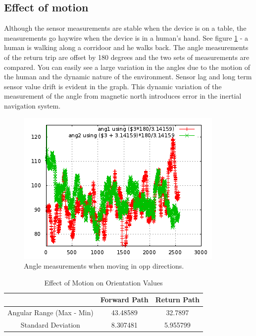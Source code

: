 \subsection{Effect of motion}

Although the sensor measurements are stable when the device is on a table,
the measurements go haywire when the device is in a human's hand. See figure
\ref{fig:angle_180_corridoor} - a human is walking along a corridoor and he walks
back. The angle measurements of the return trip are offset by 180 degrees and
the two sets of measurements are compared. You can easily see a large variation
in the angles due to the motion of the human and the dynamic nature of the environment.
Sensor lag and long term sensor value drift is evident in the graph.
This dynamic variation of the measurement of the angle from magnetic north 
introduces error in the inertial navigation system.

\begin{figure}\centering
    \includegraphics{figures/angle_180_corridoor.png}
    \caption{Angle measurements when moving in opp directions.\label{fig:angle_180_corridoor}}
\end{figure}

\begin{table}
\centering
\begin{tabular}{c c c}
\hline
\hline
 & Forward Path & Return Path \\
\hline
Angular Range (Max - Min) & 43.48589 & 32.7897 \\
Standard Deviation & 8.307481 & 5.955799 \\
\hline
\end{tabular}
\caption{Effect of Motion on Orientation Values\label{tbl:angle_motion}}
\end{table}

